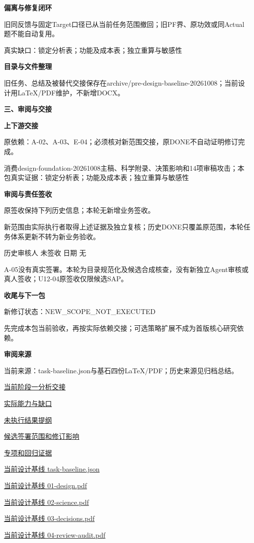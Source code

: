 \documentclass[11pt,a4paper]{article}
\newcommand{\reviewsection}[1]{\par\Needspace{5\baselineskip}\vspace{10pt}\begin{center}{\titlelatin\titlecjk\bfseries\fontsize{14}{20}\selectfont #1}\end{center}}
\newcommand{\reviewsubsection}[1]{\par\Needspace{4\baselineskip}\vspace{4pt}\begin{center}{\titlelatin\titlecjk\bfseries\fontsize{12}{18}\selectfont #1}\end{center}}
\begin{document}
\reviewsubsection{2.3 偏离与修复闭环}
旧同反馈与固定Target口径已从当前任务范围撤回；旧PF界、原功效或同Actual题不能自动复用。


真实缺口：锁定分析表；功能及成本表；独立重算与敏感性


\reviewsubsection{2.4 目录与文件整理}
旧任务、总结及被替代交接保存在archive/\allowbreak{}pre-\allowbreak{}design-\allowbreak{}baseline-\allowbreak{}20261008；当前设计用LaTeX/\allowbreak{}PDF维护，不新增DOCX。


\reviewsection{三、审阅与交接}
\reviewsubsection{3.1 上下游交接}
原依赖：A-\allowbreak{}02、A-\allowbreak{}03、E-\allowbreak{}04；必须核对新范围交接，原DONE不自动证明修订完成。


消费design-\allowbreak{}foundation-\allowbreak{}20261008主稿、科学附录、决策影响和14项审稿攻击；本包真实证据：锁定分析表；功能及成本表；独立重算与敏感性


\reviewsubsection{3.2 审阅与责任签收}
原签收保持下列历史信息；本轮无新增业务签收。


新范围由实际执行者取得上述证据及独立复核；历史DONE只覆盖原范围，本轮任务体系更新不转为新业务验收。


历史审核人 未签收    日期 无


A-\allowbreak{}05没有真实签署。本轮为目录规范化及候选合成核查，没有新独立Agent审核或真人签收；U12-\allowbreak{}04原签收仅限候选SAP。


\reviewsubsection{3.3 收尾与下一包}
新修订状态：NEW\_\allowbreak{}SCOPE\_\allowbreak{}NOT\_\allowbreak{}EXECUTED


先完成本包当前验收，再按实际依赖交接；可选策略扩展不成为首版核心研究依赖。


\reviewsubsection{3.4 审阅来源}
当前来源：task-\allowbreak{}baseline.json与基石四份LaTeX/\allowbreak{}PDF；历史来源见归档总结。


\href{file:///D:/Agent/srp/agent/tasks/A-05/outputs/current-analysis.md}{当前阶段一分析交接}


\href{file:///D:/Agent/srp/agent/tasks/A-05/outputs/current-analysis.json}{实际能力与缺口}


\href{file:///D:/Agent/srp/agent/tasks/A-05/outputs/analysis-report-template.json}{未执行结果提纲}


\href{file:///D:/Agent/srp/agent/tasks/A-05/evidence/consumer-impact.md}{候选签署范围和修订影响}


\href{file:///D:/Agent/srp/agent/tasks/A-05/evidence/verification.json}{专项和回归证据}


\href{file:///D:/Agent/srp/agent/design/design-foundation-20261008/task-baseline.json}{当前设计基线 task-\allowbreak{}baseline.json}


\href{file:///D:/Agent/srp/agent/design/design-foundation-20261008/01-design.pdf}{当前设计基线 01-\allowbreak{}design.pdf}


\href{file:///D:/Agent/srp/agent/design/design-foundation-20261008/02-science.pdf}{当前设计基线 02-\allowbreak{}science.pdf}


\href{file:///D:/Agent/srp/agent/design/design-foundation-20261008/03-decisions.pdf}{当前设计基线 03-\allowbreak{}decisions.pdf}


\href{file:///D:/Agent/srp/agent/design/design-foundation-20261008/04-review-audit.pdf}{当前设计基线 04-\allowbreak{}review-\allowbreak{}audit.pdf}
\end{document}
